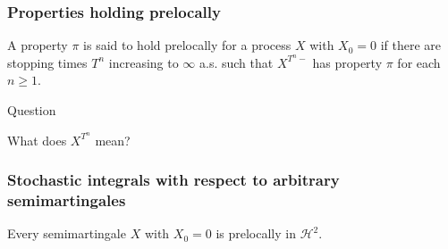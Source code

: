 \begin{frame}
    \frametitle{Properties holding prelocally}
    
    A property $\pi$ is said to hold prelocally for a process $X$ with 
    $X_0=0$ if there are stopping times $T^n$ increasing to $\infty$ a.s.
    such that $X^{T^n-}$ has property $\pi$ for each $n\geq 1$.

    \begin{block}{Question}
        
        What does $X^{T^n}$ mean?

    \end{block}


\end{frame}


\begin{frame}
    \frametitle{Stochastic integrals with respect to arbitrary semimartingales}
   
        Every semimartingale $X$ with $X_0=0$ is prelocally in $\mathcal H^2$.
\end{frame}


